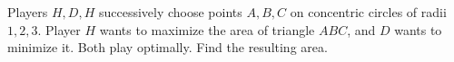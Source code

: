 Players $H,D,H$ successively choose points $A,B,C$ on concentric circles of radii $1,2,3$. Player $H$ wants to maximize the area of triangle $ABC$, and $D$ wants to minimize it. Both play optimally. Find the resulting area.
